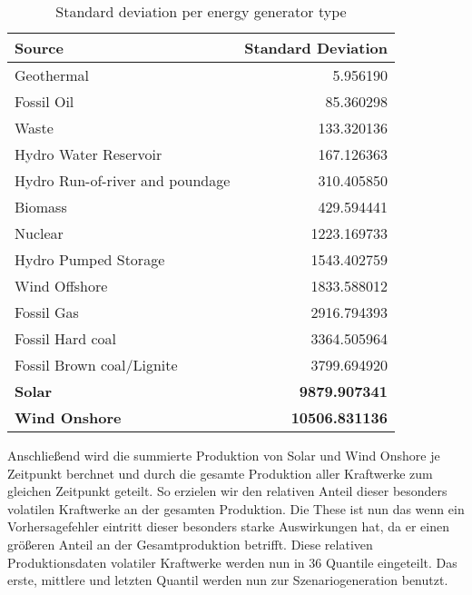 \begin{table}[ht]
	\centering
	\begin{tabular}{|l|r|}
		\hline
		\textbf{Source}                 & \textbf{Standard Deviation} \\
		\hline
		Geothermal                      & 5.956190                    \\
		Fossil Oil                      & 85.360298                   \\
		Waste                           & 133.320136                  \\
		Hydro Water Reservoir           & 167.126363                  \\
		Hydro Run-of-river and poundage & 310.405850                  \\
		Biomass                         & 429.594441                  \\
		Nuclear                         & 1223.169733                 \\
		Hydro Pumped Storage            & 1543.402759                 \\
		Wind Offshore                   & 1833.588012                 \\
		Fossil Gas                      & 2916.794393                 \\
		Fossil Hard coal                & 3364.505964                 \\
		Fossil Brown coal/Lignite       & 3799.694920                 \\
		\textbf{Solar}                  & \textbf{9879.907341}        \\
		\textbf{Wind Onshore}           & \textbf{10506.831136}       \\
		\hline
	\end{tabular}
	\caption{Standard deviation per energy generator type}
	\label{tab:energy_sources_std}
\end{table}

Anschließend wird die summierte Produktion von Solar und Wind Onshore je Zeitpunkt berchnet und
durch die gesamte Produktion aller Kraftwerke zum gleichen Zeitpunkt geteilt. So erzielen wir den relativen
Anteil dieser besonders volatilen Kraftwerke an der gesamten Produktion. Die These ist nun das wenn ein Vorhersagefehler eintritt
dieser besonders starke Auswirkungen hat, da er einen größeren Anteil an der Gesamtproduktion betrifft.
Diese relativen Produktionsdaten volatiler Kraftwerke werden nun in 36 Quantile eingeteilt. Das erste, mittlere und letzten
Quantil werden nun zur Szenariogeneration benutzt.

